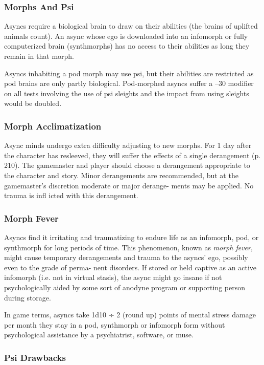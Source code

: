 \subsubsection{Morphs And Psi}

Asyncs require a biological brain to draw on their 
abilities (the brains of uplifted animals count). An 
async whose ego is downloaded into an infomorph or 
fully computerized brain (synthmorphs) has no access 
to their abilities as long they remain in that morph.

Asyncs inhabiting a pod morph may use psi, but 
their abilities are restricted as pod brains are only 
partly biological. Pod-morphed asyncs suffer a –30 
modifier on all tests involving the use of psi sleights 
and the impact from using sleights would be doubled.

\subsubsection{Morph Acclimatization}

Async minds undergo extra difficulty adjusting to new 
morphs. For 1 day after the character has resleeved, 
they will suffer the effects of a single derangement 
(p. 210). The gamemaster and player should choose a 
derangement appropriate to the character and story. 
Minor derangements are recommended, but at the 
gamemaster's discretion moderate or major derange-
ments may be applied. No trauma is infl icted with 
this derangement.

\subsubsection{Morph Fever}

Asyncs find it irritating and traumatizing to endure life 
as an infomorph, pod, or synthmorph for long periods 
of time. This phenomenon, known as \textit{morph fever}, 
might cause temporary derangements and trauma to 
the asyncs' ego, possibly even to the grade of perma-
nent disorders. If stored or held captive as an active 
infomorph (i.e. not in virtual stasis), the async might 
go insane if not psychologically aided by some sort of 
anodyne program or supporting person during storage.

In game terms, asyncs take 1d10 ÷ 2 (round up) 
points of mental stress damage per month they stay 
in a pod, synthmorph or infomorph form without 
psychological assistance by a psychiatrist, software, 
or muse.

\subsubsection{Psi Drawbacks}

